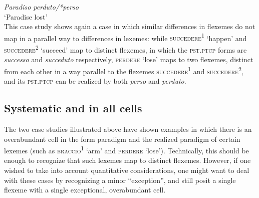 \documentclass[output=paper]{langsci/langscibook}
\begin{document}
\ex\emph{Paradiso perduto\slash{}*perso}\\\glt `Paradise lost' \\

\z\z
This case study shows again a case in which similar differences in
flexemes do not map in a parallel way to differences in lexemes: while
\textsc{succedere\textsuperscript{1}} `happen' and
\textsc{succedere\textsuperscript{2}} `succeed' map to distinct
flexemes, in which the \textsc{pst.ptcp} forms are \emph{successo} and
\emph{succeduto} respectively, \textsc{perdere} `lose' maps to two
flexemes, distinct from each other in a way parallel to the flexemes
\textsc{succedere\textsuperscript{1}} and
\textsc{succedere\textsuperscript{2}}, and its \textsc{pst.ptcp} can be
realized by both \emph{perso} and \emph{perduto}.

\subsection{Systematic  and  in all
cells}\label{systematic-overabundance-and-overabundance-in-all-cells}

The two case studies illustrated above have shown examples in which
there is an overabundant cell in the form paradigm and the realized
paradigm of certain lexemes (such as 
\textsc{braccio\textsuperscript{1}} `arm' and \textsc{perdere} `lose').
Technically, this should be enough to recognize that such lexemes map to
distinct flexemes. However, if one wished to take into account
quantitative considerations, one might want to deal with these cases by
recognizing a minor ``exception'', and still posit a single flexeme with
a single exceptional, overabundant cell.
\end{document}
